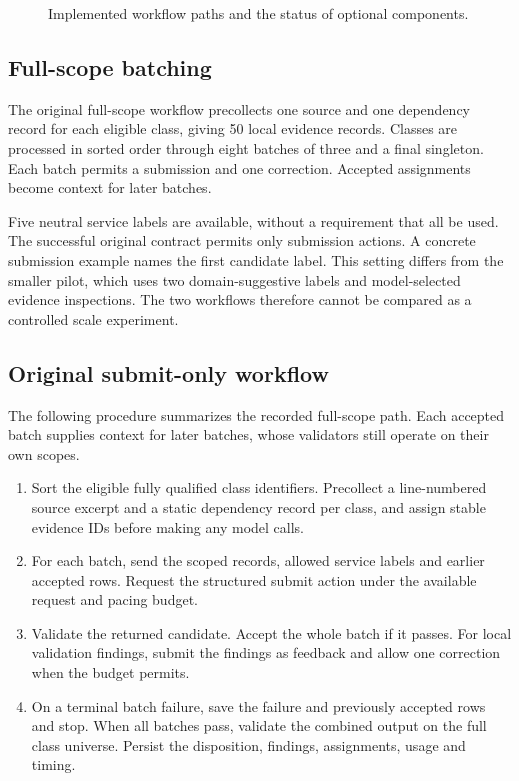 \begin{figure}[t]
\centering

\caption{Implemented workflow paths and the status of optional components.}
\label{fig:architecture}
\end{figure}


\subsection{Full-scope batching}

The original full-scope workflow precollects one source and one dependency record for each eligible class, giving 50 local evidence records. Classes are processed in sorted order through eight batches of three and a final singleton. Each batch permits a submission and one correction. Accepted assignments become context for later batches.

Five neutral service labels are available, without a requirement that all be used. The successful original contract permits only submission actions. A concrete submission example names the first candidate label. This setting differs from the smaller pilot, which uses two domain-suggestive labels and model-selected evidence inspections. The two workflows therefore cannot be compared as a controlled scale experiment.

\subsection{Original submit-only workflow}

The following procedure summarizes the recorded full-scope path. Each accepted batch supplies context for later batches, whose validators still operate on their own scopes.

\begin{enumerate}
\item Sort the eligible fully qualified class identifiers. Precollect a line-numbered source excerpt and a static dependency record per class, and assign stable evidence IDs before making any model calls.
\item For each batch, send the scoped records, allowed service labels and earlier accepted rows. Request the structured submit action under the available request and pacing budget.
\item Validate the returned candidate. Accept the whole batch if it passes. For local validation findings, submit the findings as feedback and allow one correction when the budget permits.
\item On a terminal batch failure, save the failure and previously accepted rows and stop. When all batches pass, validate the combined output on the full class universe. Persist the disposition, findings, assignments, usage and timing.
\end{enumerate}

